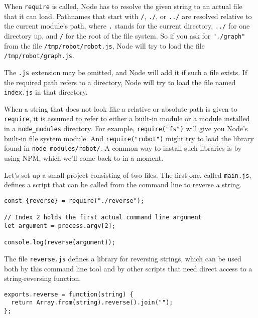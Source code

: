 When \lstinline`require` is called, Node has to resolve the given string to an actual file that it can load. Pathnames that start with \lstinline`/`, \lstinline`./`, or \lstinline`../` are resolved relative to the current module's path, where \lstinline`.` stands for the current directory, \lstinline`../` for one directory up, and \lstinline`/` for the root of the file system. So if you ask for \lstinline`"./graph"` from the file \lstinline`/tmp/robot/robot.js`, Node will try to load the file \lstinline`/tmp/robot/graph.js`.

The \lstinline`.js` extension may be omitted, and Node will add it if such a file exists. If the required path refers to a directory, Node will try to load the file named \lstinline`index.js` in that directory.

When a string that does not look like a relative or absolute path is given to \lstinline`require`, it is assumed to refer to either a built-in module or a module installed in a \lstinline`node_modules` directory. For example, \lstinline`require("fs")` will give you Node's built-in file system module. And \lstinline`require("robot")` might try to load the library found in \lstinline`node_modules/robot/`. A common way to install such libraries is by using NPM, which we'll come back to in a moment.

Let's set up a small project consisting of two files. The first one, called \lstinline`main.js`, defines a script that can be called from the command line to reverse a string.

\begin{lstlisting}
const {reverse} = require("./reverse");

// Index 2 holds the first actual command line argument
let argument = process.argv[2];

console.log(reverse(argument));
\end{lstlisting}
\noindent{}

The file \lstinline`reverse.js` defines a library for reversing strings, which can be used both by this command line tool and by other scripts that need direct access to a string-reversing function.

\begin{lstlisting}
exports.reverse = function(string) {
  return Array.from(string).reverse().join("");
};
\end{lstlisting}
\noindent{}

